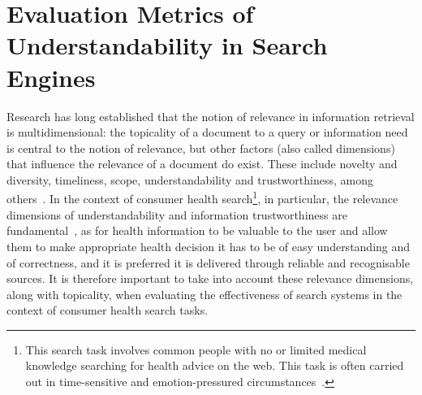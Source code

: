 
\section{Evaluation Metrics of Understandability in Search Engines}
\label{chp:evaluation_metrics}


Research has long established that the notion of relevance in information retrieval is multidimensional\todo{~\cite{}}: the topicality of a document to a query or information need is central to the notion of relevance, but other factors (also called dimensions) that influence the relevance of a document do exist. These include novelty and diversity, timeliness, scope, understandability and trustworthiness, among others~\cite{park93,schamber94}. In the context of consumer health search\footnote{This search task involves common people with no or limited medical knowledge searching for health advice on the web. This task is often carried out in time-sensitive and emotion-pressured circumstances~\cite{}.}, in particular, the relevance dimensions of understandability and information trustworthiness are fundamental~\cite{hersh08}, as for health information to be valuable to the user and allow them to make appropriate health decision it has to be of easy understanding and of correctness, and it is preferred it is delivered through reliable and recognisable sources. It is therefore important to take into account these relevance dimensions, along with topicality, when evaluating the effectiveness of search systems in the context of consumer health search tasks.

